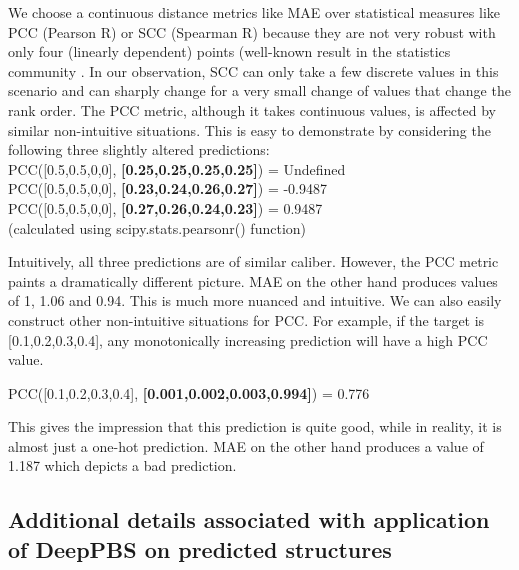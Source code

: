 We choose a continuous distance metrics like MAE over statistical measures like PCC (Pearson R) or SCC (Spearman R) because they are not very robust with only four (linearly dependent) points (well-known result in the statistics community \citep{Bonett2000, McIntyre1938}. In our observation, SCC can only take a few discrete values in this scenario and can sharply change for a very small change of values that change the rank order. The PCC metric, although it takes continuous values, is affected by similar non-intuitive situations. This is easy to demonstrate by considering the following three slightly altered predictions:
\\
PCC([0.5,0.5,0,0], \textbf{[0.25,0.25,0.25,0.25]}) = Undefined\\
PCC([0.5,0.5,0,0], \textbf{[0.23,0.24,0.26,0.27]}) = -0.9487\\
PCC([0.5,0.5,0,0], \textbf{[0.27,0.26,0.24,0.23]}) = 0.9487\\
(calculated using scipy.stats.pearsonr() function)

Intuitively, all three predictions are of similar caliber. However, the PCC metric paints a dramatically different picture. MAE on the other hand produces values of 1, 1.06 and 0.94. This is much more nuanced and intuitive. We can also easily construct other non-intuitive situations for PCC. For example, if the target is [0.1,0.2,0.3,0.4], any monotonically increasing prediction will have a high PCC value.

PCC([0.1,0.2,0.3,0.4], \textbf{[0.001,0.002,0.003,0.994]}) = 0.776

This gives the impression that this prediction is quite good, while in reality, it is almost just a one-hot prediction. MAE on the other hand produces a value of 1.187 which depicts a bad prediction.

\subsection{Additional details associated with application of DeepPBS on predicted structures}

